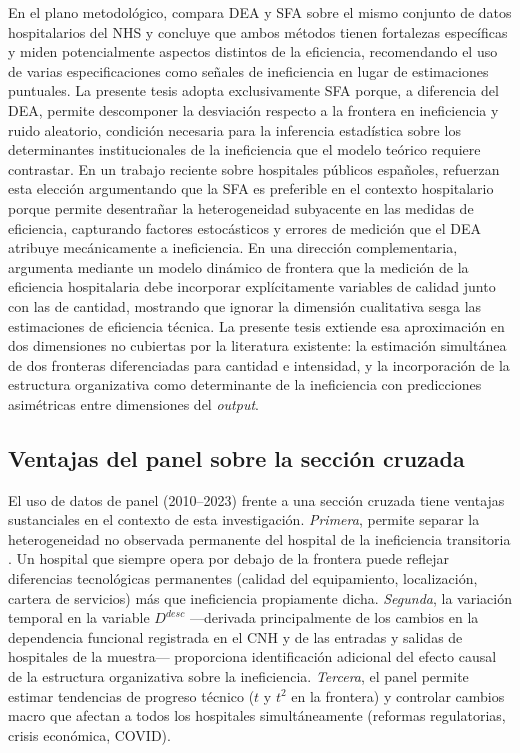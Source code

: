 En el plano metodológico, \citet{jacobs2001} compara DEA y SFA sobre el mismo conjunto de datos hospitalarios del NHS y concluye que ambos métodos tienen fortalezas específicas y miden potencialmente aspectos distintos de la eficiencia, recomendando el uso de varias especificaciones como señales de ineficiencia en lugar de estimaciones puntuales. La presente tesis adopta exclusivamente SFA porque, a diferencia del DEA, permite descomponer la desviación respecto a la frontera en ineficiencia y ruido aleatorio, condición necesaria para la inferencia estadística sobre los determinantes institucionales de la ineficiencia que el modelo teórico requiere contrastar. En un trabajo reciente sobre hospitales públicos españoles, \citet{arbelo2025unravelling} refuerzan esta elección argumentando que la SFA es preferible en el contexto hospitalario porque permite desentrañar la heterogeneidad subyacente en las medidas de eficiencia, capturando factores estocásticos y errores de medición que el DEA atribuye mecánicamente a ineficiencia. En una dirección complementaria, \citet{prior2006} argumenta mediante un modelo dinámico de frontera que la medición de la eficiencia hospitalaria debe incorporar explícitamente variables de calidad junto con las de cantidad, mostrando que ignorar la dimensión cualitativa sesga las estimaciones de eficiencia técnica. La presente tesis extiende esa aproximación en dos dimensiones no cubiertas por la literatura existente: la estimación simultánea de dos fronteras diferenciadas para cantidad e intensidad, y la incorporación de la estructura organizativa como determinante de la ineficiencia con predicciones asimétricas entre dimensiones del \textit{output}.

\subsection{Ventajas del panel sobre la sección cruzada}

El uso de datos de panel (2010--2023) frente a una sección cruzada tiene ventajas sustanciales en el contexto de esta investigación. \textit{Primera}, permite separar la heterogeneidad no observada permanente del hospital de la ineficiencia transitoria \citep{greene2005a}. Un hospital que siempre opera por debajo de la frontera puede reflejar diferencias tecnológicas permanentes (calidad del equipamiento, localización, cartera de servicios) más que ineficiencia propiamente dicha. \textit{Segunda}, la variación temporal en la variable $D^{desc}$ ---derivada principalmente de los cambios en la dependencia funcional registrada en el CNH y de las entradas y salidas de hospitales de la muestra--- proporciona identificación adicional del efecto causal de la estructura organizativa sobre la ineficiencia. \textit{Tercera}, el panel permite estimar tendencias de progreso técnico ($t$ y $t^2$ en la frontera) y controlar cambios macro que afectan a todos los hospitales simultáneamente (reformas regulatorias, crisis económica, COVID).

